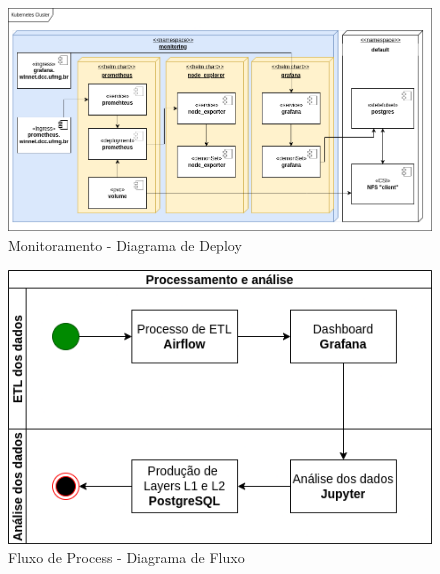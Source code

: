 \documentclass[10pt,brazil]{beamer}
\theoremstyle{definition}
\begin{document}
\begin{frame}[plain]
  \hspace*{-10mm}
  \begin{figure}
    \centering  
  \includegraphics[width=.85\paperwidth]{tcc_monitoring_deploy.png}
      \caption[Monitoramento deploy]{Monitoramento - Diagrama de Deploy}
  \end{figure}  
\end{frame}


\begin{frame}[plain]
  \hspace*{-10mm}
  \begin{figure}
    \centering  
  \includegraphics[width=.85\paperwidth]{fluxo_processo.png}
      \caption{Fluxo de Process - Diagrama de Fluxo}
  \end{figure}  
\end{frame}
\end{document}
